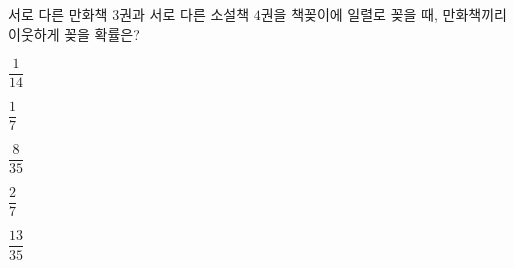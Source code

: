 서로 다른 만화책 $3$권과 서로 다른 소설책 $4$권을 책꽂이에 일렬로 꽂을 때, 만화책끼리 이웃하게 꽂을 확률은?
\begin{choices32}{\rule[-3ex]{0pt}{8ex}$\dfrac{1}{14}$}{\rule[-3ex]{0pt}{8ex}$\dfrac{1}{7}$}{\rule[-3ex]{0pt}{8ex}$\dfrac{8}{35}$}{\rule[-3ex]{0pt}{8ex}$\dfrac{2}{7}$}{\rule[-3ex]{0pt}{8ex}$\dfrac{13}{35}$}\end{choices32}
